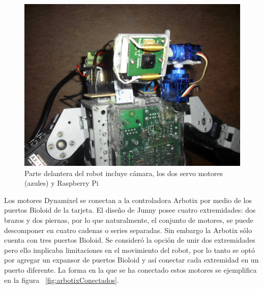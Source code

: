 
 
\begin{figure}[hbtp]
\centering
\includegraphics[scale=0.05]{imagenes/servosYcamara.JPG}
\caption{Parte delantera del robot incluye c\'amara, los dos servo motores (azules) y Raspberry Pi}
\label{fig:servosycam}
\end{figure}

Los motores Dynamixel se conectan a la controladora Arbotix por medio de los puertos Bioloid de la tarjeta. El diseño de Junny posee cuatro extremidades: dos brazos y dos piernas, por lo que naturalmente, el conjunto de motores, se puede descomponer en cuatro cadenas o series separadas. Sin embargo la Arbotix s\'olo cuenta con tres puertos Bioloid. Se consideró la opción de unir dos extremidades pero ello implicaba limitaciones en el movimiento del robot, por lo tanto se optó por agregar un expansor de puertos Bioloid y así conectar cada extremidad en un puerto diferente. La forma en la que se ha conectado estos motores se ejemplifica en la figura ~\ref{fig:arbotixConectados}. 

